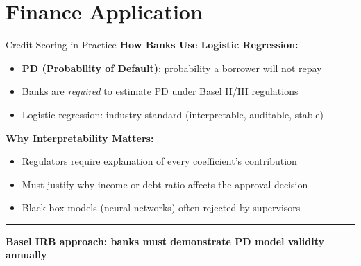 \documentclass[8pt,aspectratio=169]{beamer}
\newcommand{\bottomnote}[1]{%
\vfill
\vspace{-2mm}
\textcolor{mllavender2}{\rule{\textwidth}{0.4pt}}
\vspace{1mm}
\footnotesize
\textbf{#1}
}
\begin{document}
\section{Finance Application}

\begin{frame}[t]{Credit Scoring in Practice}
\textbf{How Banks Use Logistic Regression:}
\begin{itemize}
\item \textbf{PD (Probability of Default)}: probability a borrower will not repay
\item Banks are \emph{required} to estimate PD under Basel II/III regulations
\item Logistic regression: industry standard (interpretable, auditable, stable)
\end{itemize}

\vspace{0.3em}
\textbf{Why Interpretability Matters:}
\begin{itemize}
\item Regulators require explanation of every coefficient's contribution
\item Must justify why income or debt ratio affects the approval decision
\item Black-box models (neural networks) often rejected by supervisors
\end{itemize}
\bottomnote{Basel IRB approach: banks must demonstrate PD model validity annually}
\end{frame}
\end{document}
